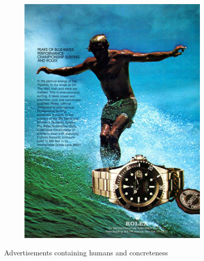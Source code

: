 \documentclass[hidelinks,11pt,a4paper]{report}
\begin{document}
\begin{figure}
\begin{subfigure}[b]{0.3\textwidth}
     \end{subfigure}
     \begin{subfigure}[b]{0.3\textwidth}
         \centering
         \includegraphics[width=\textwidth,scale=1.0]{images/humans_concreteness_img3.pdf}
         \caption{}
         
     \end{subfigure}
    \caption{Advertisements containing humans and concreteness}
    \label{fig:humans_concreteness-ads}
\end{figure}
\end{document}
